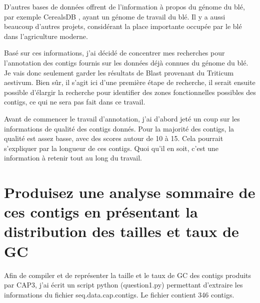 \documentclass[10.9pt]{article} %
\begin{document}
D'autres bases de données offrent de l'information à propos du génome du blé, par exemple CerealsDB \cite{cerealsDB}, ayant un génome
de travail du blé. Il y a aussi beaucoup d'autres projets, considérant la place importante occupée par le blé dans l'agriculture moderne.

Basé sur ces informations, j'ai décidé de concentrer mes recherches pour l'annotation des contigs fournis sur les données déjà
connues du génome du blé. Je vais donc seulement garder les résultats de Blast provenant du Triticum aestivum. Bien sûr, il s'agit
ici d'une première étape de recherche, il serait ensuite possible d'élargir la recherche pour identifier des zones fonctionnelles possibles
des contigs, ce qui ne sera pas fait dans ce travail.

Avant de commencer le travail d'annotation, j'ai d'abord jeté un coup sur les informations de qualité des contigs donnés. Pour la majorité
des contigs, la qualité est assez basse, avec des scores autour de 10 à 15. Cela pourrait s'expliquer par la longueur de ces contigs.
Quoi qu'il en soit, c'est une information à retenir tout au long du travail.


\newpage
\section{Produisez une analyse sommaire de ces contigs en présentant la distribution des tailles et taux de GC} %

Afin de compiler et de représenter la taille et le taux de GC des contigs produits par
CAP3, j'ai écrit un script python (question1.py) permettant d'extraire les informations du
fichier seq.data.cap.contigs. Le fichier contient 346 contigs.
\end{document}

